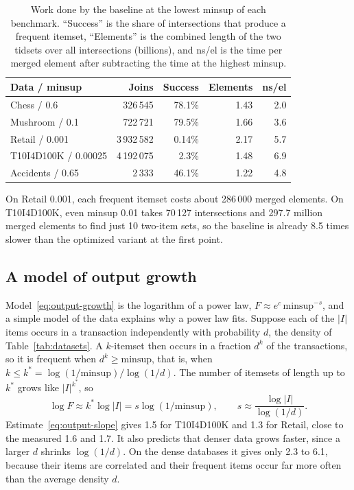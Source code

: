 \begin{table}[t]
\centering
\small
\setlength{\tabcolsep}{3pt}
\caption{Work done by the baseline at the lowest minsup of each benchmark. ``Success'' is
the share of intersections that produce a frequent itemset, ``Elements'' is the combined
length of the two tidsets over all intersections (billions), and ns/el is the time per
merged element after subtracting the time at the highest minsup.}
\label{tab:join-work}
\begin{tabular}{lrrrr}
\hline
Data / minsup & Joins & Success & Elements & ns/el \\
\hline
Chess / 0.6 & 326\,545 & 78.1\% & 1.43 & 2.0 \\
Mushroom / 0.1 & 722\,721 & 79.5\% & 1.66 & 3.6 \\
Retail / 0.001 & 3\,932\,582 & 0.14\% & 2.17 & 5.7 \\
T10I4D100K / 0.00025 & 4\,192\,075 & 2.3\% & 1.48 & 6.9 \\
Accidents / 0.65 & 2\,333 & 46.1\% & 1.22 & 4.8 \\
\hline
\end{tabular}
\end{table}

On Retail 0.001, each frequent itemset costs about 286\,000 merged elements. On
T10I4D100K, even minsup 0.01 takes 70\,127 intersections and 297.7 million merged elements
to find just 10 two-item sets, so the baseline is already 8.5 times slower than the
optimized variant at the first point.

\subsection{A model of output growth}
\label{app:output-model}
Model~\eqref{eq:output-growth} is the logarithm of a power law,
$F \approx e^{c}\,\mathrm{minsup}^{-s}$, and a simple model of the data explains why a
power law fits. Suppose each of the $|I|$ items occurs in a transaction independently with
probability $d$, the density of Table~\ref{tab:datasets}. A $k$-itemset then occurs in a
fraction $d^k$ of the transactions, so it is frequent when $d^k \ge \mathrm{minsup}$, that
is, when $k \le k^* = \log(1/\mathrm{minsup}) / \log(1/d)$. The number of itemsets of
length up to $k^*$ grows like $|I|^{k^*}$, so
\begin{equation}
  \log F \approx k^* \log|I| = s \log(1/\mathrm{minsup}), \qquad
  s \approx \frac{\log|I|}{\log(1/d)}.
  \label{eq:output-slope}
\end{equation}
Estimate~\eqref{eq:output-slope} gives 1.5 for T10I4D100K and 1.3 for Retail, close to
the measured 1.6 and 1.7. It also predicts that denser data grows faster, since a larger
$d$ shrinks $\log(1/d)$. On the dense databases it gives only 2.3 to 6.1, because their
items are correlated and their frequent items occur far more often than the average
density $d$.

